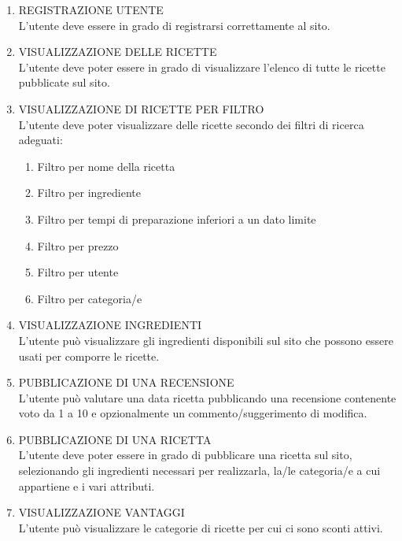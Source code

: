 \begin{enumerate}[label=\textbf{U\arabic* - }, leftmargin=1.2cm, itemsep=0.8em]

    \item REGISTRAZIONE UTENTE\\
    L’utente deve essere in grado di registrarsi correttamente al sito.

    \item VISUALIZZAZIONE DELLE RICETTE\\
    L’utente deve poter essere in grado di visualizzare l’elenco di tutte le ricette pubblicate sul sito.

    \item VISUALIZZAZIONE DI RICETTE PER FILTRO\\
    L’utente deve poter visualizzare delle ricette secondo dei filtri di ricerca adeguati:
    \begin{enumerate}[label=\textbf{U3.\arabic* - }, leftmargin=1.2cm, itemsep=0.2em, topsep=0.3em]
        \item Filtro per nome della ricetta
        \item Filtro per ingrediente
        \item Filtro per tempi di preparazione inferiori a un dato limite
        \item Filtro per prezzo
        \item Filtro per utente
        \item Filtro per categoria/e
    \end{enumerate}

    \item VISUALIZZAZIONE INGREDIENTI\\
    L’utente può visualizzare gli ingredienti disponibili sul sito che possono essere usati per comporre le ricette.

    \item PUBBLICAZIONE DI UNA RECENSIONE\\
    L’utente può valutare una data ricetta pubblicando una recensione contenente voto da 1 a 10 e opzionalmente un commento/suggerimento di modifica.

    \item PUBBLICAZIONE DI UNA RICETTA\\
    L’utente deve poter essere in grado di pubblicare una ricetta sul sito, selezionando gli ingredienti necessari per realizzarla, la/le categoria/e a cui appartiene e i vari attributi.

    \item VISUALIZZAZIONE VANTAGGI\\
    L’utente può visualizzare le categorie di ricette per cui ci sono sconti attivi.


\end{enumerate}
